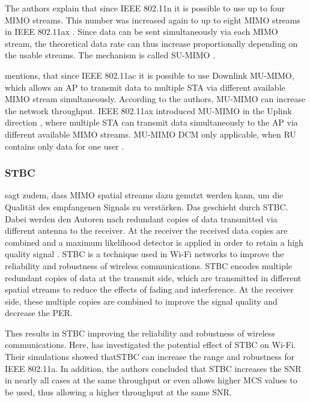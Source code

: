 The authors explain that since IEEE 802.11n it is possible to use up to four MIMO streams. This number was increased again to
up to eight MIMO streams in IEEE 802.11ax \cite{noauthor_ieee_2021}. Since data can be sent simultaneously via each MIMO stream,
the theoretical data rate can thus increase proportionally depending on the usable streams. The mechanism is called \ac{SU}-\ac{MIMO} \cite{noauthor_ieee_2021}.

\textcite{sauter_wireless_2022} mentions, that since IEEE 802.11ac it is possible to use Downlink \ac{MU}-\ac{MIMO}, which allows an \ac{AP} to transmit data to multiple \ac{STA} via different available \ac{MIMO} stream simultaneously.
According to the authors, \ac{MU}-\ac{MIMO} can increase the network throughput.
IEEE 802.11ax introduced \ac{MU}-\ac{MIMO} in the Uplink direction \cite{noauthor_ieee_2021}, where multiple \ac{STA} can transmit data simultaneously to the \ac{AP} via different available \ac{MIMO} streams.
MU-\ac{MIMO} DCM only applicable, when RU contains only data for one user \cite{noauthor_ieee_2021}.
\subsubsection*{\acf{STBC}}
\textcite{abbas_efficient_2016} sagt zudem, dass \ac{MIMO} spatial streams dazu genutzt werden kann, um die Qualität des empfangenen Signals zu verstärken.
Das geschieht durch \ac{STBC}. Dabei werden den Autoren nach redundant copies of data transmitted via different antenna to the receiver. At the receiver the received data copies are combined and a maximum likelihood detector is applied in order to retain a high quality signal \cite{santumon_space-time_2012}.
\ac{STBC} is a technique used in Wi-Fi networks to improve the reliability and robustness of wireless communications.
\ac{STBC} encodes multiple redundant copies of data at the transmit side, which are transmitted in different spatial streams to
reduce the effects of fading and interference. At the receiver side, these multiple copies are combined to improve the
signal quality and decrease the \ac{PER}.

Thes results in \ac{STBC} improving the reliability and robustness of wireless communications.
Here, \textcite{stamoulis_impact_2003} has investigated the potential effect of \ac{STBC} on Wi-Fi. Their simulations showed that\ac{STBC} can increase the range and robustness for IEEE 802.11a.
In addition, the authors concluded that \ac{STBC} increases the \ac{SNR} in nearly all cases at the same throughput or even allows higher \ac{MCS} values to be used,
thus allowing a higher throughput at the same \ac{SNR}.

